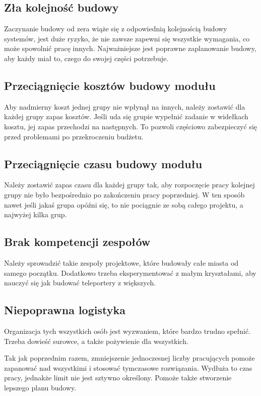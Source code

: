 \subsection{Zła kolejność budowy}
Zaczynanie budowy od zera wiąże się z odpowiednią kolejnością budowy systemów, jest duże ryzyko, że nie zawsze zapewni się wszystkie wymagania, co może spowolnić pracę innych. 
Najważniejsze jest poprawne zaplanowanie budowy, aby każdy miał to, czego do swojej części potrzebuje.

\subsection{Przeciągnięcie kosztów budowy modułu}
Aby nadmierny koszt jednej grupy nie wpłynął na innych, należy zostawić dla każdej grupy zapas kosztów.
Jeśli uda się grupie wypełnić zadanie w widełkach kosztu, jej zapas przechodzi na następnych.
To pozwoli częściowo zabezpieczyć się przed problemami po przekroczeniu budżetu.

\subsection{Przeciągnięcie czasu budowy modułu}
Należy zostawić zapas czasu dla każdej grupy tak, aby rozpoczęcie pracy kolejnej grupy nie było bezpośrednio po zakończeniu pracy poprzedniej.
W ten sposób nawet jeśli jakaś grupa opóźni się, to nie pociągnie ze sobą całego projektu, a najwyżej kilka grup.

\subsection{Brak kompetencji zespołów}
Należy sprowadzić takie zespoły projektowe, które budowały całe miasta od samego początku.
Dodatkowo trzeba eksperymentować z małym kryształami, aby nauczyć się jak budować teleportery z większych.

\subsection{Niepoprawna logistyka}
Organizacja tych wszystkich osób jest wyzwaniem, które bardzo trudno spełnić. Trzeba dowieść surowce, a także pożywienie dla wszystkich. 

Tak jak poprzednim razem, zmniejszenie jednoczesnej liczby pracujących pomoże zapanować nad wszystkimi i stosować tymczasowe rozwiązania.
Wydłuża to czas pracy, jednakże limit nie jest sztywno określony. Pomoże także stworzenie lepszego planu budowy.
 
